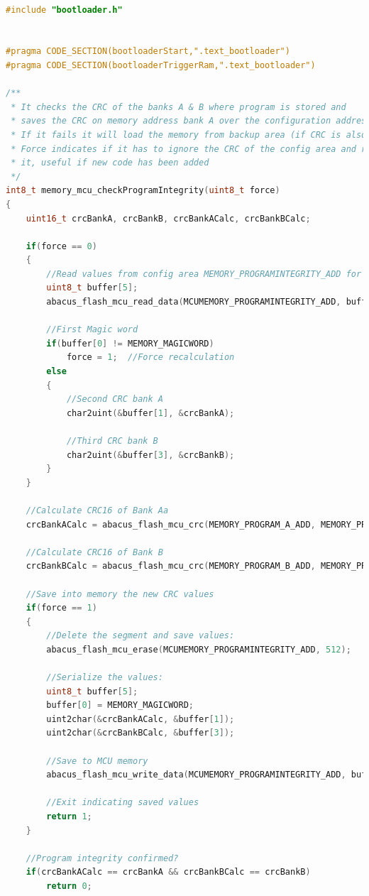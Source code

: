 \documentclass[LaM,binding=0.6cm]{../sapthesis}
\begin{document}
\begin{lstlisting}[language=c]

#include "bootloader.h"


#pragma CODE_SECTION(bootloaderStart,".text_bootloader")
#pragma CODE_SECTION(bootloaderTriggerRam,".text_bootloader")

/**
 * It checks the CRC of the banks A & B where program is stored and
 * saves the CRC on memory address bank A over the configuration address
 * If it fails it will load the memory from backup area (if CRC is also correct)
 * Force indicates if it has to ignore the CRC of the config area and recalculate
 * it, useful if new code has been added
 */
int8_t memory_mcu_checkProgramIntegrity(uint8_t force)
{
    uint16_t crcBankA, crcBankB, crcBankACalc, crcBankBCalc;

    if(force == 0)
    {
        //Read values from config area MEMORY_PROGRAMINTEGRITY_ADD for banks A and B
        uint8_t buffer[5];
        abacus_flash_mcu_read_data(MCUMEMORY_PROGRAMINTEGRITY_ADD, buffer, 5);

        //First Magic word
        if(buffer[0] != MEMORY_MAGICWORD)
            force = 1;  //Force recalculation
        else
        {
            //Second CRC bank A
            char2uint(&buffer[1], &crcBankA);

            //Third CRC bank B
            char2uint(&buffer[3], &crcBankB);
        }
    }

    //Calculate CRC16 of Bank Aa
    crcBankACalc = abacus_flash_mcu_crc(MEMORY_PROGRAM_A_ADD, MEMORY_PROGRAM_A_SIZE);

    //Calculate CRC16 of Bank B
    crcBankBCalc = abacus_flash_mcu_crc(MEMORY_PROGRAM_B_ADD, MEMORY_PROGRAM_B_SIZE);

    //Save into memory the new CRC values
    if(force == 1)
    {
        //Delete the segment and save values:
        abacus_flash_mcu_erase(MCUMEMORY_PROGRAMINTEGRITY_ADD, 512);

        //Serialize the values:
        uint8_t buffer[5];
        buffer[0] = MEMORY_MAGICWORD;
        uint2char(&crcBankACalc, &buffer[1]);
        uint2char(&crcBankBCalc, &buffer[3]);

        //Save to MCU memory
        abacus_flash_mcu_write_data(MCUMEMORY_PROGRAMINTEGRITY_ADD, buffer, 5);

        //Exit indicating saved values
        return 1;
    }

    //Program integrity confirmed?
    if(crcBankACalc == crcBankA && crcBankBCalc == crcBankB)
        return 0;


\end{lstlisting}
\end{document}
